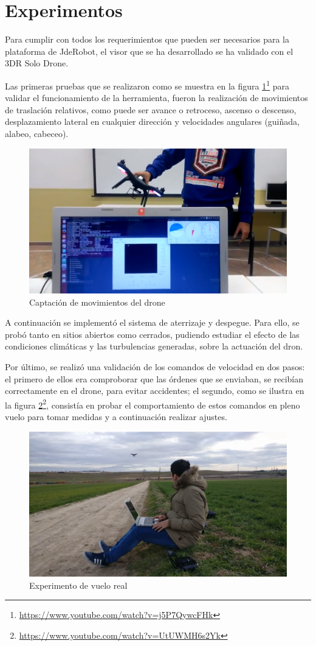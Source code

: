 \section{Experimentos}
Para cumplir con todos los requerimientos que pueden ser necesarios para la plataforma de JdeRobot, el visor que se ha desarrollado se ha validado con el 3DR Solo Drone.

Las primeras pruebas que se realizaron como se muestra en la figura \ref{fig:experimentoConUAV}\footnote{\url{https://www.youtube.com/watch?v=j5P7QywcFHk}} para validar el funcionamiento de la herramienta, fueron la realización de movimientos de traslación relativos, como puede ser avance o retroceso, ascenso o descenso, desplazamiento lateral en cualquier dirección y velocidades angulares (guiñada, alabeo, cabeceo).
\begin{figure}[H]
  \centering
  \includegraphics[scale=0.25]{imagenes/EXP1.png}
  \caption{Captación de movimientos del drone}
  \label{fig:experimentoConUAV}
\end{figure}
A continuación se implementó el sistema de aterrizaje y despegue. Para ello, se probó tanto en sitios abiertos como cerrados, pudiendo estudiar el efecto de las condiciones climáticas y las turbulencias generadas, sobre la actuación del dron.

Por último, se realizó una validación de los comandos de velocidad en dos pasos: el primero de ellos era comproborar que las órdenes que se enviaban, se recibían correctamente en el drone, para evitar accidentes; el segundo, como se ilustra en la figura \ref{fig:experimentoConjunto}\footnote{\url{https://www.youtube.com/watch?v=UtUWMH6s2Yk}}, consistía en probar el comportamiento de estos comandos en pleno vuelo para tomar medidas y a continuación realizar ajustes.   

\begin{figure}[H]
  \centering
  \includegraphics[scale=0.25]{imagenes/EXP2.png}
  \caption{Experimento de vuelo real}
  \label{fig:experimentoConjunto}
\end{figure}
